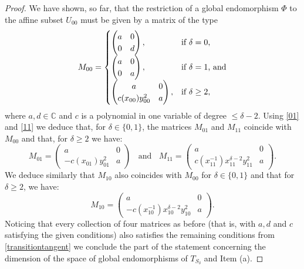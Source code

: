 \documentclass{amsart} %
\theoremstyle{definition}
\begin{document}
\begin{proof}
We have shown, so far, that the restriction of a global endomorphism $\Phi$ to the affine subset $U_{00}$
must be given by a matrix of the type
\begin{equation}\label{MUnew}
  M_{00} =
        \begin{cases}
              \begin{pmatrix}
          a & 0 \\
          0 & d
        \end{pmatrix}, & \text{if $  \delta = 0 $,} \\
       \begin{pmatrix}
          a & 0 \\
          0 & a
        \end{pmatrix}, & \text{if $  \delta = 1 $,  and}\\
        \begin{pmatrix}
          a & 0 \\
          c(x_{00}) y_{00}^2 & a
        \end{pmatrix}, & \text{if $  \delta \geq 2 $,}
    \end{cases}
\end{equation}
where $ a, d \in \mathbb{C} $ and $ c $ is a polynomial in one variable of degree $ \leq \delta-2 $.
Using \eqref{01} and \eqref{11} we deduce that, for $\delta\in \{0,1\}$, the matrices $M_{01}$ and
$ M_{11} $ coincide with $ M_{00} $ and that, for $\delta\geq 2$ we have:
\[
M_{01} =
        \begin{pmatrix}
          a & 0 \\
          -c(x_{01}) y_{01}^2 & a
        \end{pmatrix}\;\;\mbox{ and }\;\; M_{11}=\begin{pmatrix}
          a & 0 \\
          c(x_{11}^{-1})x_{11}^{\delta-2} y_{11}^2 & a
        \end{pmatrix}.
\]
We deduce similarly that $ M_{10} $ also coincides with $ M_{00} $ for $\delta\in \{0,1\}$
and that for $\delta\geq 2$, we have:
\[
 M_{10} =
        \begin{pmatrix}
          a & 0 \\
          -c(x_{10}^{-1}) x_{10}^{\delta-2} y_{10}^2 & a
        \end{pmatrix}.
\]
Noticing that every collection of four matrices as before (that is,
with $a,d$ and $c$ satisfying the given conditions) also satisfies the remaining conditions
from \eqref{transitiontangent} we conclude the part of the statement
concerning the dimension of the space of global endomorphisms of $T_{S_{\delta}}$ and Item (a).


\end{proof}
\end{document}
